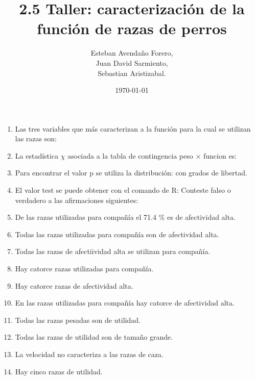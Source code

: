 \documentclass[letterpaper, 12pt]{article}
\title{2.5 Taller: caracterización de la función de razas de perros}
\author{Esteban Avendaño Forero,\\
Juan David Sarmiento,\\
Sebastian Aristizabal.}
\date{\today}
\begin{document}


\maketitle

\begin{enumerate}
\item Las tres variables que más caracterizan a la función para la cual se
utilizan las razas son:
\item La estadística $\chi$ asociada a la tabla de contingencia peso × funcion
es:
\item Para encontrar el valor p se utiliza la distribución: con grados de libertad.
\item El valor test se puede obtener con el comando de R:
Conteste falso o verdadero a las afirmaciones siguientes:
\item De las razas utilizadas para compañía el 71.4 \% es de afectividad
alta.
\item Todas las razas utilizadas para compañía son de afectividad alta.
\item Todas las razas de afectiividad alta se utilizan para compañía.
\item Hay catorce razas utilizadas para compañía.
\item Hay catorce razas de afectividad alta.
\item En las razas utilizadas para compañía hay catorce de afectividad alta.
\item Todas las razas pesadas son de utilidad.
\item Todas las razas de utilidad son de tamaño grande.
\item La velocidad no caracteriza a las razas de caza.
\item Hay cinco razas de utilidad.
\end{enumerate}
\end{document}
